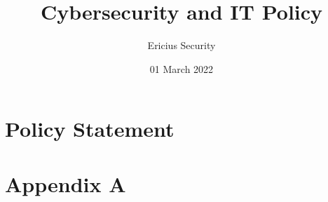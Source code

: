 \documentclass[12pt, letterpaper, oneside, BCOR=5mm]{scrartcl}
\title{Cybersecurity and IT Policy}
\author{Ericius Security}
\date{01 March 2022}
\begin{document}
    \maketitle
    \pagebreak
    \tableofcontents
    \pagebreak
    \section{Policy Statement}
    
    \pagebreak
    \section{Appendix A}
    
\end{document}
